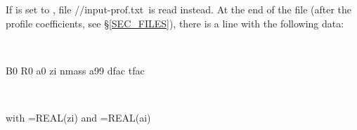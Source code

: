 \

\

If  is set to \true, file {\ttfamily //input-prof.txt}~is read instead. At the end of the file (after the profile coefficients, see \S\ref{SEC_FILES}), there is a line with the following data:

\

{\ttfamily  B0     R0      a0      zi      nmass   a99     dfac    tfac}

\

with ={\ttfamily REAL(zi)} and ={\ttfamily REAL(ai)}%




